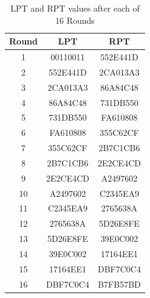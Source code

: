 \documentclass[12pt, letterpaper]{article}
\begin{document}
\begin{table}[ht]
  \centering
  
  \label{tab:sample-table}
    \begin{tabular}{|c|c|c|}
    
      \hline
    Round & LPT & RPT  \\
    \hline
    1 & 00110011 & 552E441D  \\
        \hline
    2 & 552E441D & 2CA013A3

  \\
         \hline
    3 & 2CA013A3 & 86A84C48  \\
         \hline
    4 & 86A84C48 & 731DB550   \\
         \hline
    5 & 731DB550 & FA610808  \\
        \hline
    6 & FA610808 & 355C62CF   \\
         \hline
    7 &  355C62CF & 2B7C1CB6

  \\
         \hline
    8 & 2B7C1CB6 & 2E2CE4CD

 

  \\
         \hline
    9 & 2E2CE4CD

 & A2497602

  \\
         \hline
    10 & A2497602

 & C2345EA9

  \\
         \hline
    11 & C2345EA9

 & 2765638A

  \\
         \hline
    12 & 2765638A

 & 5D26E8FE

  \\
         \hline
    13 & 5D26E8FE

 & 39E0C002 \\
         \hline
    14 & 39E0C002 & 17164EE1

  \\
         \hline
    15 & 17164EE1

 & DBF7C0C4

  \\
         \hline
    16 & DBF7C0C4

 & B7FB57BD

  \\
    \hline
  \end{tabular}
    \caption{LPT and RPT values after each of 16 Rounds}

    

\end{table}
\end{document}

